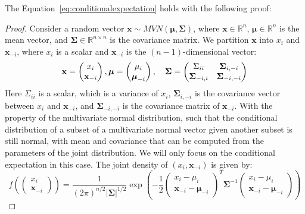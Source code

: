 The Equation~\ref{eq:conditionalexpectation} holds with the following proof: 
\begin{proof}
    Consider a random vector $\mathbf{x}\sim MVN(\boldsymbol{\mu},\boldsymbol{\Sigma})$, where $\mathbf{x}\in \mathbb{R}^n$, $\boldsymbol{\mu}\in\mathbb{R}^n$ is the mean vector, and $\boldsymbol{\Sigma}\in\mathbb{R}^{n\times n}$ is the covariance matrix.
    We partition $\mathbf{x}$ into $x_i$ and $\mathbf{x}_{-i}$, where $x_i$ is a scalar and $\mathbf{x}_{-i}$ is the $(n-1)$-dimensional vector:
    \begin{equation*}
        \mathbf{x}=\begin{pmatrix} x_i \\ \mathbf{x}_{-i} \end{pmatrix},\\ \boldsymbol{\mu} = \begin{pmatrix} \mu_i \\ \boldsymbol{\mu}_{-i} \end{pmatrix},\quad \boldsymbol{\Sigma}=\begin{pmatrix} \Sigma_{ii} & \boldsymbol{\Sigma}_{i,-i}\\ \boldsymbol{\Sigma}_{-i,i} & \boldsymbol{\Sigma}_{-i,-i} \end{pmatrix}
    \end{equation*}
    Here $\Sigma_{ii}$ is a scalar, which is a variance of $x_i$, $\boldsymbol{\Sigma}_{i,-i}$ is the covariance vector between $x_i$ and $\mathbf{x}_{-i}$, and $\boldsymbol{\Sigma}_{-i,-i}$ is the covariance matrix of $\mathbf{x}_{-i}$. 
    With the property of the multivariate normal distribution, such that the conditional distribution of a subset of a multivariate normal vector given another subset is still normal, with mean and covariance that can be computed from the parameters of the joint distribution. 
    We will only focus on the conditional expectation in this case. 
    The joint density of $(x_i, \mathbf{x}_{-i})$ is given by: 
    \begin{equation*}
        f\left ( \begin{pmatrix} x_i \\ \mathbf{x}_{-i} \end{pmatrix} \right ) = \frac{1}{(2\pi)^{n/2} |\boldsymbol{\Sigma}|^{1/2}} \exp \left ( -\frac{1}{2} \begin{pmatrix} x_i - \mu_i \\ \mathbf{x}_{-i} - \boldsymbol{\mu}_{-i} \end{pmatrix}^T \boldsymbol{\Sigma}^{-1} \begin{pmatrix} x_i - \mu_i \\ \mathbf{x}_{-i} - \boldsymbol{\mu}_{-i} \end{pmatrix} \right )

\end{equation*}
\end{proof}
